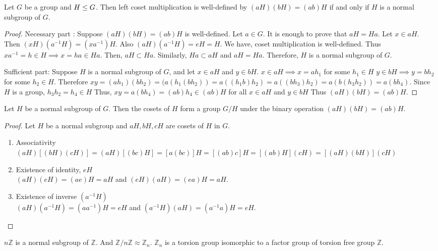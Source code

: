 \begin{theorem}
	Let $G$ be a group and $H \le G$.
	Then left coset multiplication is well-defined by $(aH)(bH) = (ab)H$ if and only if $H$ is a normal subgroup of $G$.
\end{theorem}
\begin{proof}
	Necessary part :
	Suppose $(aH)(bH) = (ab)H$ is well-defined.
	Let $a \in G$.
	It is enough to prove that $aH = Ha$.
	Let $x \in aH$.
	Then $(xH)(a^{-1}H) = (xa^{-1})H$.
	Also $(aH)(a^{-1}H) = eH = H$.
	We have, coset multiplication is well-defined.
	Thus $xa^{-1} = h \in H \implies x = ha \in Ha$.
	Then, $aH \subset Ha$.
	Similarly, $Ha \subset aH$ and $aH = Ha$.
	Therefore, $H$ is a normal subgroup of $G$.

	Sufficient part:
	Suppose $H$ is a normal subgroup of $G$,
	and let $x \in aH$ and $y \in bH$.
	$x \in aH \implies x = ah_1$ for some $h_1 \in H$
	$y \in bH \implies y = bh_2$ for some $h_2 \in H$.
	Therefore $xy = (ah_1)(bh_2) = (a(h_1(bh_2)) = a((h_1b)h_2) = a((bh_3)h_2) = a(b(h_3h_2)) = a(bh_4)$.
	Since $H$ is a group, $h_3h_2 = h_4 \in H$
	Thus, $xy = a(bh_4) = (ab)h_4 \in (ab)H$ for all $x \in aH$ and $y \in bH$
	Thus $(aH)(bH) = (ab)H$.
\end{proof}

\begin{corollary}
	Let $H$ be a normal subgroup of $G$.
	Then the cosets of $H$ form a group $G/H$ under the binary operation $(aH)(bH) = (ab)H$.
\end{corollary}
\begin{proof}
	Let $H$ be a normal subgroup and $aH,bH,cH$ are cosets of $H$ in $G$.
	\begin{enumerate}[label=G\arabic*]
		\item Associativity\\
			$(aH)[(bH)(cH)] = (aH)[(bc)H] = [a(bc)]H = [(ab)c]H = [(ab)H](cH) = [(aH)(bH)](cH)$
		\item Existence of identity, $eH$\\
			$(aH)(eH) = (ae)H = aH$ and $(eH)(aH) = (ea)H = aH$.
		\item Existence of inverse $(a^{-1}H)$\\
			$(aH)(a^{-1}H) = (aa^{-1})H = eH$ and $(a^{-1}H)(aH) = (a^{-1}a)H = eH$.
	\end{enumerate}
\end{proof}

\begin{remark}
	$n\mathbb{Z}$ is a normal subgroup of $\mathbb{Z}$.
	And $\mathbb{Z}/n\mathbb{Z} \approx \mathbb{Z}_n$.
	$\mathbb{Z}_n$ is a torsion group isomorphic to a factor group of torsion free group $\mathbb{Z}$.
\end{remark}


